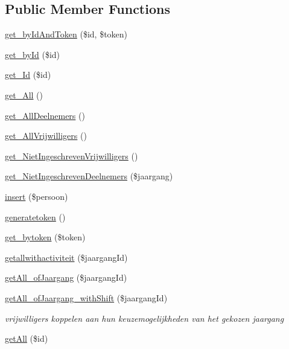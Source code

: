 \subsection*{Public Member Functions}
\begin{DoxyCompactItemize}
\item 
\mbox{\hyperlink{class_persoon__model_a4fe7a2f8ac42cd4901ef68b06358d93f}{get\+\_\+by\+Id\+And\+Token}} (\$id, \$token)
\item 
\mbox{\hyperlink{class_persoon__model_a98d28a4d9a29d40c5a8aa0176f19a919}{get\+\_\+by\+Id}} (\$id)
\item 
\mbox{\hyperlink{class_persoon__model_a8d14f8e8d18daadab52042074396a6b8}{get\+\_\+\+Id}} (\$id)
\item 
\mbox{\hyperlink{class_persoon__model_a7e94dd1f7edfacea0d0814ff027b7e04}{get\+\_\+\+All}} ()
\item 
\mbox{\hyperlink{class_persoon__model_a7e0633aa62a76b8fb9bf35c6167a2a0f}{get\+\_\+\+All\+Deelnemers}} ()
\item 
\mbox{\hyperlink{class_persoon__model_a34374012facb64562423057666ed535d}{get\+\_\+\+All\+Vrijwilligers}} ()
\item 
\mbox{\hyperlink{class_persoon__model_ae20838d9cd61c63ac26fdb07f4b7bff4}{get\+\_\+\+Niet\+Ingeschreven\+Vrijwilligers}} ()
\item 
\mbox{\hyperlink{class_persoon__model_a44c616f540f2ca1deb731244c9ff648d}{get\+\_\+\+Niet\+Ingeschreven\+Deelnemers}} (\$jaargang)
\item 
\mbox{\hyperlink{class_persoon__model_abb16337bee193e227f25cb9e37ac9394}{insert}} (\$persoon)
\item 
\mbox{\hyperlink{class_persoon__model_a40ea86b0c55c207673f65d23a4a8e98d}{generatetoken}} ()
\item 
\mbox{\hyperlink{class_persoon__model_aad1045b9fabfabcb3090fb0b0b17a6e6}{get\+\_\+bytoken}} (\$token)
\item 
\mbox{\hyperlink{class_persoon__model_a9767acf5a4796aaacd967a4ac44e7a33}{getallwithactiviteit}} (\$jaargang\+Id)
\item 
\mbox{\hyperlink{class_persoon__model_aba5a7a9b6a803620d0fddcbfffa83148}{get\+All\+\_\+of\+Jaargang}} (\$jaargang\+Id)
\item 
\mbox{\hyperlink{class_persoon__model_afa062e8195502a034cfa2780c6763cf6}{get\+All\+\_\+of\+Jaargang\+\_\+with\+Shift}} (\$jaargang\+Id)
\begin{DoxyCompactList}\small\item\em vrijwilligers koppelen aan hun keuzemogelijkheden van het gekozen jaargang \end{DoxyCompactList}\item 
\mbox{\hyperlink{class_persoon__model_a9169319ec748964dc67f0f640d182250}{get\+All}} (\$id)
\end{DoxyCompactItemize}


